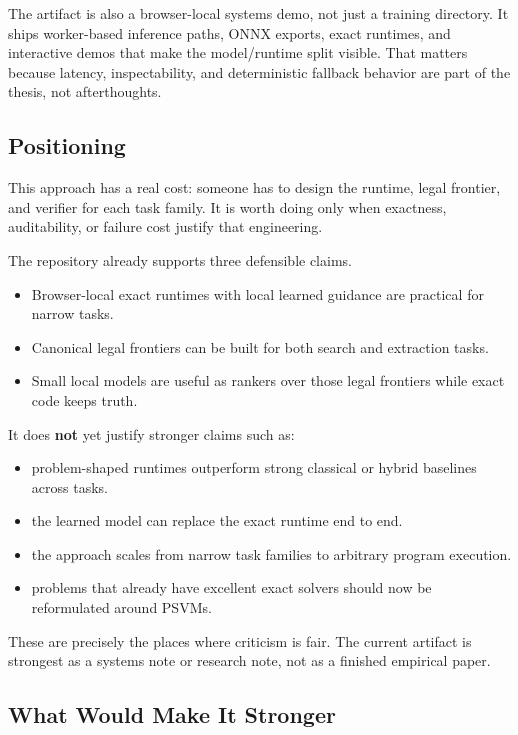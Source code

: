 \documentclass[
]{article}
\providecommand{\tightlist}{%
  \setlength{\itemsep}{0pt}\setlength{\parskip}{0pt}}
\begin{document}
The artifact is also a browser-local systems demo, not just a training
directory. It ships worker-based inference paths, ONNX exports, exact
runtimes, and interactive demos that make the model/runtime split
visible. That matters because latency, inspectability, and deterministic
fallback behavior are part of the thesis, not afterthoughts.

\subsection{Positioning}\label{positioning}

This approach has a real cost: someone has to design the runtime, legal
frontier, and verifier for each task family. It is worth doing only when
exactness, auditability, or failure cost justify that engineering.

The repository already supports three defensible claims.

\begin{itemize}
\tightlist
\item
  Browser-local exact runtimes with local learned guidance are practical
  for narrow tasks.
\item
  Canonical legal frontiers can be built for both search and extraction
  tasks.
\item
  Small local models are useful as rankers over those legal frontiers
  while exact code keeps truth.
\end{itemize}

It does \textbf{not} yet justify stronger claims such as:

\begin{itemize}
\tightlist
\item
  problem-shaped runtimes outperform strong classical or hybrid
  baselines across tasks.
\item
  the learned model can replace the exact runtime end to end.
\item
  the approach scales from narrow task families to arbitrary program
  execution.
\item
  problems that already have excellent exact solvers should now be
  reformulated around PSVMs.
\end{itemize}

These are precisely the places where criticism is fair. The current
artifact is strongest as a systems note or research note, not as a
finished empirical paper.

\subsection{What Would Make It
Stronger}\label{what-would-make-it-stronger}
\end{document}
